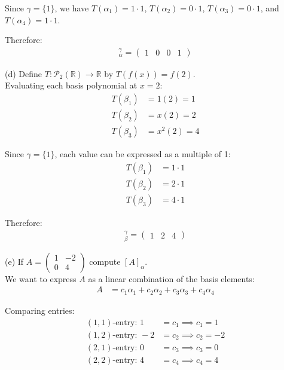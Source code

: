 \documentclass{article}
\begin{document}
Since $\gamma = \{1\}$, we have $T(\alpha_1) = 1\cdot 1$, $T(\alpha_2) = 0\cdot 1$, $T(\alpha_3) = 0\cdot 1$, and $T(\alpha_4) = 1\cdot 1$.

Therefore:
\begin{align*}
[T]_{\alpha}^{\gamma} = \begin{pmatrix} 1 & 0 & 0 & 1 \end{pmatrix}
\end{align*}

(d) Define $T : \mathcal{P}_2(\mathbb{R}) \to \mathbb{R}$ by $T(f(x)) = f(2)$. \\

Evaluating each basis polynomial at $x = 2$:
\begin{align*}
T(\beta_1) &= 1(2) = 1\\
T(\beta_2) &= x(2) = 2\\
T(\beta_3) &= x^2(2) = 4
\end{align*}

Since $\gamma = \{1\}$, each value can be expressed as a multiple of 1:
\begin{align*}
T(\beta_1) &= 1\cdot 1\\
T(\beta_2) &= 2\cdot 1\\
T(\beta_3) &= 4\cdot 1
\end{align*}

Therefore:
\begin{align*}
[T]_{\beta}^{\gamma} = \begin{pmatrix} 1 & 2 & 4 \end{pmatrix}
\end{align*}

(e) If $A = \begin{pmatrix} 1 & -2 \\ 0 & 4 \end{pmatrix}$ compute $[A]_{\alpha}$. \\

We want to express $A$ as a linear combination of the basis elements:
\begin{align*}
A &= c_1\alpha_1 + c_2\alpha_2 + c_3\alpha_3 + c_4\alpha_4
\end{align*}

Comparing entries:
\begin{align*}
(1,1)\text{-entry: } 1 &= c_1 \implies c_1 = 1\\
(1,2)\text{-entry: } -2 &= c_2 \implies c_2 = -2\\
(2,1)\text{-entry: } 0 &= c_3 \implies c_3 = 0\\
(2,2)\text{-entry: } 4 &= c_4 \implies c_4 = 4
\end{align*}
\end{document}

